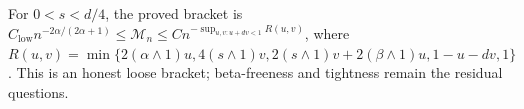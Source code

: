For \(0<s<d/4\), the proved bracket is \(C_{\mathrm{low}}n^{-2\alpha/(2\alpha+1)}\le\mathcal M_n\le C n^{-\sup_{u,v:u+dv<1}R(u,v)}\), where \(R(u,v)=\min\{2(\alpha\wedge1)u,4(s\wedge1)v,2(s\wedge1)v+2(\beta\wedge1)u,1-u-dv,1\}\). This is an honest loose bracket; beta-freeness and tightness remain the residual questions.